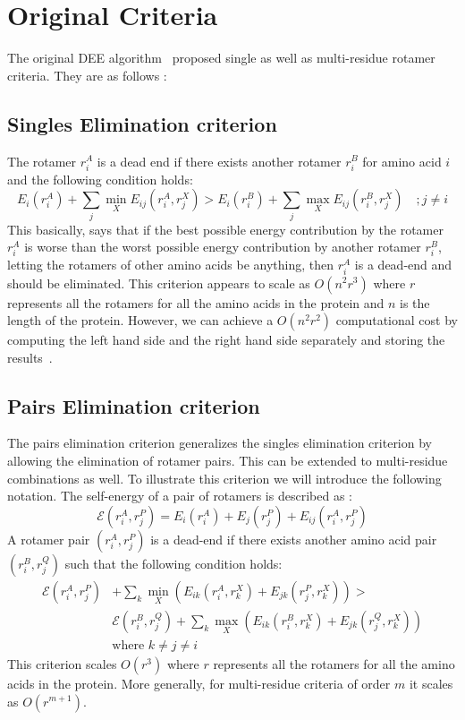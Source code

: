 \documentclass{article}
\begin{document}
\section{Original Criteria}
The original DEE algorithm~\cite{Desmet1992} proposed single as well as multi-residue rotamer criteria. They are as follows :

\subsection{Singles Elimination criterion}
The rotamer $r_i^A$ is a dead end if there exists another rotamer $r_i^B$ for amino acid $i$ and the following condition holds: 
\begin{equation}	
\label{Singles:criteria} 
E_i(r_i^A) + \sum_j \min_X E_{ij}(r_i^A,r_j^X) > E_i(r_i^B) + \sum_j \max_X E_{ij}(r_i^B,r_j^X) \quad   ; j\neq i
\end{equation}
This basically, says that if the best possible energy contribution by the rotamer $r_i^A$ is worse than the worst possible energy contribution by another rotamer $r_i^B$, letting the rotamers of other amino acids be anything, then $r_i^A$ is a dead-end and should be eliminated.
This criterion appears to scale as $O(n^2r^3)$ where $r$ represents all the rotamers for all the amino acids in the protein and $n$ is the length of the protein. However, we can achieve a $O(n^2r^2)$ computational cost by computing the left hand side and the right hand side separately and storing the results~\cite{Pierce2000}.

\subsection{Pairs Elimination criterion}
The pairs elimination criterion generalizes the singles elimination criterion by allowing the elimination of rotamer pairs. This can be extended to multi-residue combinations as well. To illustrate this criterion we will introduce the following notation. The self-energy of a pair of rotamers is described as : 
\[
\mathcal{E}(r_i^A,r_j^P) = E_i(r_i^A) + E_j(r_j^P) + E_{ij}(r_i^A,r_j^P)
\]
A rotamer pair $(r_i^A,r_j^P)$ is a dead-end if there exists another amino acid pair $(r_i^B,r_j^Q)$ such that the following condition holds:
\[
\begin{split}
\mathcal{E}(r_i^A,r_j^P) &+ \sum_k \min_X \left( E_{ik}(r_i^A,r_k^X) + E_{jk}(r_j^P,r_k^X) \right) > \\ & \mathcal{E}(r_i^B,r_j^Q) + \sum_k \max_X \left( E_{ik}(r_i^B,r_k^X) + E_{jk}(r_j^Q,r_k^X) \right) \\
& \text{where $k\neq j \neq i$}
\end{split}
\]
This criterion scales $O(r^3)$ where $r$ represents all the rotamers for all the amino acids in the protein. More generally, for multi-residue criteria of order $m$ it scales as $O(r^{m+1})$. 
\end{document}
